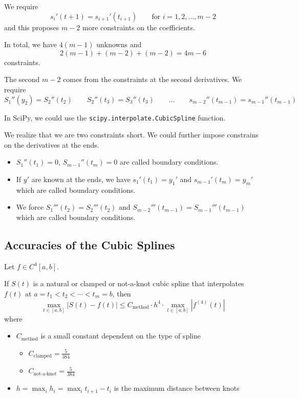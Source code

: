 \begin{example}
\begin{itemize}
              We require \[
                  s_i'(t + 1) = s_{i+1}'(t_{i+1}) \qquad \text{for } i = 1, 2, \ldots, m-2
              \] and this proposes \( m - 2 \) more constraints on the coefficients.
    \end{itemize}

    In total, we have \( 4(m - 1) \) unknowns and \[
        2(m-1) + (m-2) + (m-2) = 4m - 6
    \] constraints.

    The second \( m-2 \) comes from the constraints at the second derivatives. We require \[
        S_1''(y_2) = S_2''(t_2) \qquad S_2''(t_3) = S_3''(t_3) \qquad \dots \qquad s_{m-2}''(t_{m-1}) = s_{m-1}''(t_{m-1})
    \]
\end{example}

\begin{remark}
    In SciPy, we could use the \texttt{scipy.interpolate.CubicSpline} function.
\end{remark}

We realize that we are two constraints short. We could further impose constrains on the derivatives at the ends.

\begin{itemize}
    \item \( S_1''(t_1) = 0 \), \( S_{m-1}''(t_m) = 0 \) are called  boundary conditions.
    \item If \( y' \) are known at the ends, we have \( s_1'(t_1) = y_1' \) and \( s_{m-1}'(t_m) = y_m' \) which are called  boundary conditions.
    \item We force \( S_1'''(t_2) = S_2'''(t_2) \) and \( S_{m-2}'''(t_{m-1}) = S_{m-1}'''(t_{m-1}) \) which are called  boundary conditions.
\end{itemize}

\subsection{Accuracies of the Cubic Splines}

\begin{theorem}
    Let \( f \in C^4[a, b] \).

    If \( S(t) \) is a natural or clamped or not-a-knot cubic spline that interpolates \( f(t) \) at \( a = t_1 < t_2 < \cdots < t_m = b \), then \[
        \max_{t \in [a, b]} | S(t) - f(t) | \leq C_{\text{method}} \cdot h^4 \cdot \max_{t \in [a, b]} | f^{(4)}(t) |
    \] where
    \begin{itemize}
        \item \( C_{\text{method}} \) is a small constant dependent on the type of spline
              \begin{itemize}
                  \item \( C_{\text{clamped}} = \frac{5}{384} \)
                  \item \( C_{\text{not-a-knot}} = \frac{5}{384} \)
              \end{itemize}
        \item \( h = \max_{i} h_i = \max_{i} t_{i+1}-t_i \) is the maximum distance between knots
    \end{itemize}
\end{theorem}

